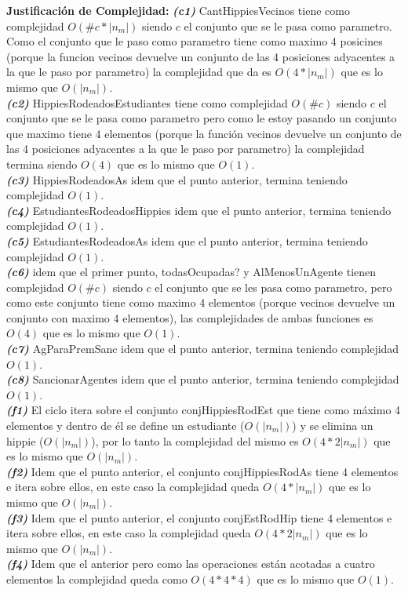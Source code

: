 \textbf{Justificación de Complejidad:} \textit{\textbf{(c1)}} CantHippiesVecinos tiene como complejidad $O(\#c * |n_m|)$ siendo $c$ el conjunto que se le pasa como parametro. Como el conjunto que le paso como parametro tiene como maximo 4 posicines (porque la funcion vecinos devuelve un conjunto de las 4 posiciones adyacentes a la que le paso por parametro) la complejidad que da es $O(4*|n_m|)$ que es lo mismo que $O(|n_m|)$. \\
\textit{\textbf{(c2)}} HippiesRodeadosEstudiantes tiene como complejidad $O(\#c)$ siendo $c$ el conjunto que se le pasa como parametro pero como le estoy pasando un conjunto que maximo tiene 4 elementos (porque la función vecinos devuelve un conjunto de las 4 posiciones adyacentes a la que le paso por parametro) la complejidad termina siendo $O(4)$ que es lo mismo que $O(1)$. \\
\textit{\textbf{(c3)}} HippiesRodeadosAs idem que el punto anterior, termina teniendo complejidad $O(1)$. \\
\textit{\textbf{(c4)}} EstudiantesRodeadosHippies idem que el punto anterior, termina teniendo complejidad $O(1)$. \\
\textit{\textbf{(c5)}} EstudiantesRodeadosAs idem que el punto anterior, termina teniendo complejidad $O(1)$. \\
\textit{\textbf{(c6)}} idem que el primer punto, todasOcupadas? y AlMenosUnAgente tienen complejidad $O(\#c)$ siendo $c$ el conjunto que se les pasa como parametro, pero como este conjunto tiene como maximo 4 elementos (porque vecinos devuelve un conjunto con maximo 4 elementos), las complejidades de ambas funciones es $O(4)$ que es lo mismo que $O(1)$. \\
\textit{\textbf{(c7)}} AgParaPremSanc idem que el punto anterior, termina teniendo complejidad $O(1)$. \\
\textit{\textbf{(c8)}} SancionarAgentes idem que el punto anterior, termina teniendo complejidad $O(1)$. \\
\textit{\textbf{(f1)}} El ciclo itera sobre el conjunto conjHippiesRodEst que tiene como máximo 4 elementos y dentro de él se define un estudiante ($O(|n_m|)$) y se elimina un hippie ($O(|n_m|)$), por lo tanto la complejidad del mismo es $O(4*2|n_m|)$ que es lo mismo que $O(|n_m|)$. \\
\textit{\textbf{(f2)}} Idem que el punto anterior, el conjunto conjHippiesRodAs tiene 4 elementos e itera sobre ellos, en este caso la complejidad queda $O(4*|n_m|)$ que es lo mismo que  $O(|n_m|)$. \\
\textit{\textbf{(f3)}} Idem que el punto anterior, el conjunto conjEstRodHip tiene 4 elementos e itera sobre ellos, en este caso la complejidad queda $O(4*2|n_m|)$ que es lo mismo que  $O(|n_m|)$. \\
\textit{\textbf{(f4)}} Idem que el anterior pero como las operaciones están acotadas a cuatro elementos la complejidad queda como $O(4*4*4)$ que es lo mismo que $O(1)$.



